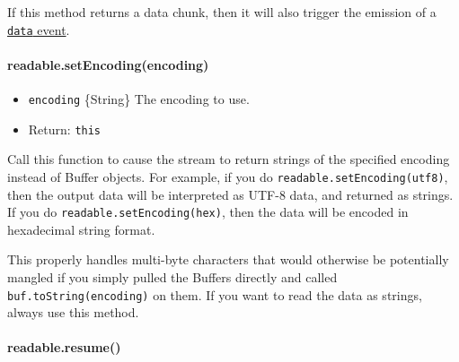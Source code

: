 If this method returns a data chunk, then it will also trigger the
emission of a
\hyperref[streamux5feventux5fdata]{\texttt{\textquotesingle{}data\textquotesingle{}}
event}.

\paragraph{readable.setEncoding(encoding)}\label{readable.setencodingencoding}

\begin{itemize}
\itemsep1pt\parskip0pt
\item
  \texttt{encoding} \{String\} The encoding to use.
\item
  Return: \texttt{this}
\end{itemize}

Call this function to cause the stream to return strings of the
specified encoding instead of Buffer objects. For example, if you do
\texttt{readable.setEncoding(\textquotesingle{}utf8\textquotesingle{})},
then the output data will be interpreted as UTF-8 data, and returned as
strings. If you do
\texttt{readable.setEncoding(\textquotesingle{}hex\textquotesingle{})},
then the data will be encoded in hexadecimal string format.

This properly handles multi-byte characters that would otherwise be
potentially mangled if you simply pulled the Buffers directly and called
\texttt{buf.toString(encoding)} on them. If you want to read the data as
strings, always use this method.

\begin{Shaded}
\end{Shaded}

\paragraph{readable.resume()}\label{readable.resume}

